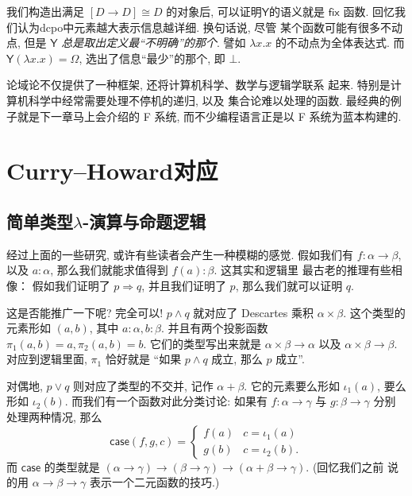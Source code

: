 \documentclass[UTF8]{ctexbook}
\newcommand{\cons}[1]{\textsf{#1}}
\theoremstyle{plain}
\theoremstyle{definition}
\theoremstyle{remark}
\begin{document}
我们构造出满足 \([D \to D] \cong D\) 的对象后,
可以证明\(\cons{Y}\)的语义就是 \(\cons{fix}\) 函数.
回忆我们认为dcpo中元素越大表示信息越详细.
换句话说, 尽管
某个函数可能有很多不动点, 但是 \(\cons{Y}\)
\emph{总是取出定义最“不明确”的那个}. 譬如 \(\lambda x.x\)
的不动点为全体表达式. 而 \(\cons{Y}(\lambda x. x) = \Omega\),
选出了信息“最少”的那个, 即 \(\bot\).


论域论不仅提供了一种框架, 还将计算机科学、数学与逻辑学联系
起来. 特别是计算机科学中经常需要处理不停机的递归, 以及
集合论难以处理的函数. 最经典的例子就是下一章马上会介绍的
F 系统, 而不少编程语言正是以 F 系统为蓝本构建的.

\chapter{Curry--Howard对应} %
\section{简单类型\texorpdfstring{\(\lambda\)}{Lambda}-演算与命题逻辑}

经过上面的一些研究, 或许有些读者会产生一种模糊的感觉.
假如我们有 \(f : \alpha \to \beta\), 以及 \(a : \alpha\),
那么我们就能求值得到 \(f(a) : \beta\). 这其实和逻辑里
最古老的推理有些相像： 假如我们证明了 \(p\Rightarrow q\),
并且我们证明了 \(p\), 那么我们就可以证明 \(q\).

这是否能推广一下呢? 完全可以! \(p \wedge q\) 就对应了
Descartes 乘积 \(\alpha \times \beta\). 这个类型的
元素形如 \((a, b)\), 其中 \(a : \alpha, b : \beta\).
并且有两个投影函数 \(\pi_1(a, b) = a, \pi_2(a, b) = b\).
它们的类型写出来就是 \(\alpha \times\beta \to \alpha\)
以及 \(\alpha\times\beta \to \beta\). 对应到逻辑里面, \(\pi_1\)
恰好就是 “如果 \(p \wedge q\) 成立, 那么 \(p\) 成立”.

对偶地, \(p\vee q\) 则对应了类型的不交并, 记作
\(\alpha + \beta\). 它的元素要么形如 \(\iota_1(a)\),
要么形如 \(\iota_2(b)\). 而我们有一个函数对此分类讨论:
如果有 \(f : \alpha \to \gamma\) 与 \(g : \beta \to \gamma\)
分别处理两种情况, 那么
\[\cons{case}(f,g,c) = \begin{cases}
  f(a) & c = \iota_1(a)\\
  g(b) & c = \iota_2(b).
\end{cases}\]
而 \(\cons{case}\) 的类型就是
\((\alpha \to \gamma) \to (\beta \to \gamma)
\to (\alpha + \beta \to \gamma)\). (回忆我们之前
说的用 \(\alpha \to \beta\to \gamma\) 表示一个二元函数的技巧.)
\end{document}
